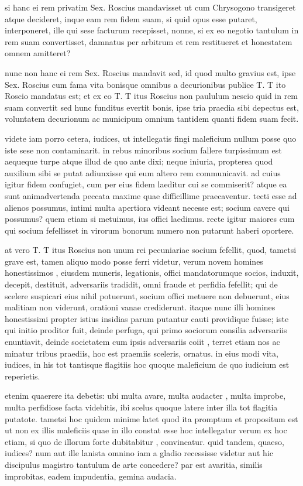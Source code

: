  si hanc ei rem privatim Sex. Roscius mandavisset ut cum Chrysogono transigeret atque decideret, inque eam rem fidem suam, si quid opus esse putaret, interponeret, ille qui sese facturum recepisset, nonne, si ex eo negotio tantulum in rem suam convertisset, damnatus per arbitrum et rem restitueret et honestatem omnem amitteret?

 nunc non hanc ei rem Sex. Roscius mandavit sed, id quod multo gravius est, ipse Sex. Roscius cum fama vita bonisque omnibus a decurionibus publice T. T ito Roscio mandatus est; et ex eo T. T itus Roscius non paululum nescio quid in rem suam convertit sed hunc funditus evertit bonis, ipse tria praedia sibi depectus est, voluntatem decurionum ac municipum omnium tantidem quanti fidem suam fecit.

 videte iam porro cetera, iudices, ut intellegatis fingi maleficium nullum posse quo iste sese non contaminarit. in rebus minoribus socium fallere turpissimum est aequeque turpe atque illud de quo ante dixi; neque iniuria, propterea quod auxilium sibi se putat adiunxisse qui eum altero rem communicavit. ad cuius igitur fidem confugiet, cum per eius fidem laeditur cui se commiserit? atque ea sunt animadvertenda peccata maxime quae difficillime praecaventur. tecti esse ad alienos possumus, intimi multa apertiora videant necesse est; socium cavere qui possumus? quem etiam si metuimus, ius offici laedimus. recte igitur maiores cum qui socium fefellisset in virorum bonorum numero non putarunt haberi oportere.

 at vero T. T itus Roscius non unum rei pecuniariae socium fefellit, quod, tametsi grave est, tamen aliquo modo posse ferri videtur, verum novem homines honestissimos , eiusdem muneris, legationis, offici mandatorumque socios, induxit, decepit, destituit, adversariis tradidit, omni fraude et perfidia fefellit; qui de scelere suspicari eius nihil potuerunt, socium offici metuere non debuerunt, eius malitiam non viderunt, orationi vanae crediderunt. itaque nunc illi homines honestissimi propter istius insidias parum putantur cauti providique fuisse; iste qui initio proditor fuit, deinde perfuga, qui primo sociorum consilia adversariis enuntiavit, deinde societatem cum ipsis adversariis coiit , terret etiam nos ac minatur tribus praediis, hoc est praemiis sceleris, ornatus. in eius modi vita, iudices, in his tot tantisque flagitiis hoc quoque maleficium de quo iudicium est reperietis.

 etenim quaerere ita debetis: ubi multa avare, multa audacter , multa improbe, multa perfidiose facta videbitis, ibi scelus quoque latere inter illa tot flagitia putatote. tametsi hoc quidem minime latet quod ita promptum et propositum est ut non ex illis maleficiis quae in illo constat esse hoc intellegatur verum ex hoc etiam, si quo de illorum forte dubitabitur , convincatur. quid tandem, quaeso, iudices? num aut ille lanista omnino iam a gladio recessisse videtur aut hic discipulus magistro tantulum de arte concedere? par est avaritia, similis improbitas, eadem impudentia, gemina audacia.

